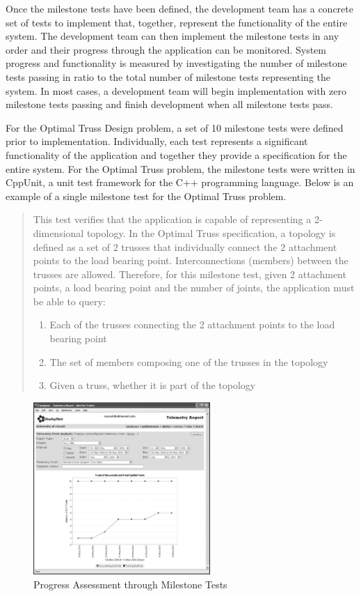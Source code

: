 \documentclass[10pt,twocolumn]{article}
\begin{document}
Once the milestone tests have been defined, the development team has a
concrete set of tests to implement that, together, represent the
functionality of the entire system.  The development team can then
implement the milestone tests in any order and their progress through
the application can be monitored.  System progress and functionality
is measured by investigating the number of milestone tests passing in
ratio to the total number of milestone tests representing the system.
In most cases, a development team will begin implementation with zero
milestone tests passing and finish development when all milestone
tests pass.

For the Optimal Truss Design problem, a set of 10 milestone tests were
defined prior to implementation.  Individually, each test represents a
significant functionality of the application and together they provide a
specification for the entire system.  For the Optimal Truss problem, the
milestone tests were written in CppUnit, a unit test framework for the C++
programming language.  Below is an example of a single milestone test for
the Optimal Truss problem.

\begin{quotation}
 This test verifies that the application is 
capable of representing a 2-dimensional topology.  In the Optimal Truss
specification, a topology is defined as a set of 2 trusses that
individually connect the 2 attachment points to the load bearing
point.  Interconnections (members) between the trusses are allowed.
Therefore, for this milestone test, given 2 attachment points, a load
bearing point and the number of joints, the application must be able
to query:

\begin{enumerate}
\item Each of the trusses connecting the 2 attachment points to the load
bearing point
\item The set of members composing one of the trusses in the topology
\item Given a truss, whether it is part of the topology
\end{enumerate}
\end{quotation}

\begin{figure}[htpb]
  \centering
  \includegraphics[width=0.60\textwidth]{truss.functionality.eps}
  \caption{Progress Assessment through Milestone Tests}
  \label{fig:functionality}
\end{figure}
\end{document}
